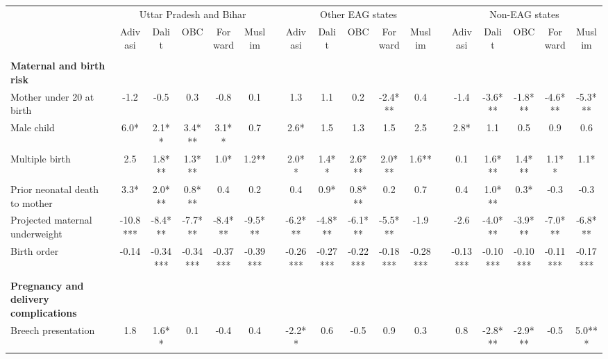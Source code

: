 \begin{tabular}{l*{5}{c}@{\hspace{1.4em}}c@{\hspace{1.4em}}*{5}{c}@{\hspace{1.4em}}c@{\hspace{1.4em}}*{5}{c}}
\toprule
& \multicolumn{5}{c}{Uttar Pradesh and Bihar} & & \multicolumn{5}{c}{Other EAG states} & & \multicolumn{5}{c}{Non-EAG states} \\
\cmidrule(lr){2-6} \cmidrule(lr){8-12} \cmidrule(lr){14-18}
\addlinespace[0.25em]
& \tiny Adivasi & \tiny Dalit & \tiny OBC & \tiny Forward & \tiny Muslim & & \tiny Adivasi & \tiny Dalit & \tiny OBC & \tiny Forward & \tiny Muslim & & \tiny Adivasi & \tiny Dalit & \tiny OBC & \tiny Forward & \tiny Muslim \\
\midrule
&&&&&&&&&&&&&&&&&\\
\textbf{Maternal and birth risk}&&&&&&&&&&&&&&&&&\\
\hspace*{2em}Mother under 20 at birth&-1.2&-0.5&0.3&-0.8&0.1&&1.3&1.1&0.2&-2.4***&0.4&&-1.4&-3.6***&-1.8***&-4.6***&-5.3***\\
\hspace*{2em}Male child&6.0*&2.1**&3.4***&3.1**&0.7&&2.6*&1.5&1.3&1.5&2.5&&2.8*&1.1&0.5&0.9&0.6\\
\hspace*{2em}Multiple birth&2.5&1.8***&1.3***&1.0*&1.2**&&2.0**&1.4**&2.6***&2.0***&1.6**&&0.1&1.6***&1.4***&1.1**&1.1*\\
\hspace*{2em}Prior neonatal death to mother&3.3*&2.0***&0.8***&0.4&0.2&&0.4&0.9*&0.8***&0.2&0.7&&0.4&1.0***&0.3*&-0.3&-0.3\\
\hspace*{2em}Projected maternal underweight&-10.8***&-8.4***&-7.7***&-8.4***&-9.5***&&-6.2***&-4.8***&-6.1***&-5.5***&-1.9&&-2.6&-4.0***&-3.9***&-7.0***&-6.8***\\
\hspace*{2em}Birth order&-0.14&-0.34***&-0.34***&-0.37***&-0.39***&&-0.26***&-0.27***&-0.22***&-0.18***&-0.28***&&-0.13***&-0.10***&-0.10***&-0.11***&-0.17***\\
&&&&&&&&&&&&&&&&&\\
\textbf{Pregnancy and delivery complications}&&&&&&&&&&&&&&&&&\\
\hspace*{2em}Breech presentation&1.8&1.6**&0.1&-0.4&0.4&&-2.2**&0.6&-0.5&0.9&0.3&&0.8&-2.8***&-2.9***&-0.5&5.0***\\

\end{tabular}
